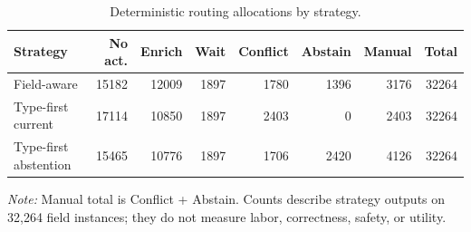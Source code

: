 \begin{table}[t]
\centering
\caption{Deterministic routing allocations by strategy.}
\label{tab:rq2-actions}
\footnotesize
\setlength{\tabcolsep}{3pt}
\begin{tabular}{lrrrrrrr}
\toprule
Strategy & No act. & Enrich & Wait & Conflict & Abstain & Manual & Total \\
\midrule
Field-aware & 15182 & 12009 & 1897 & 1780 & 1396 & 3176 & 32264 \\
Type-first current & 17114 & 10850 & 1897 & 2403 & 0 & 2403 & 32264 \\
Type-first abstention & 15465 & 10776 & 1897 & 1706 & 2420 & 4126 & 32264 \\
\bottomrule
\end{tabular}
\begin{minipage}{0.98\linewidth}
\footnotesize\textit{Note:} Manual total is Conflict + Abstain. Counts describe strategy outputs on 32,264 field instances; they do not measure labor, correctness, safety, or utility.
\end{minipage}
\end{table}
